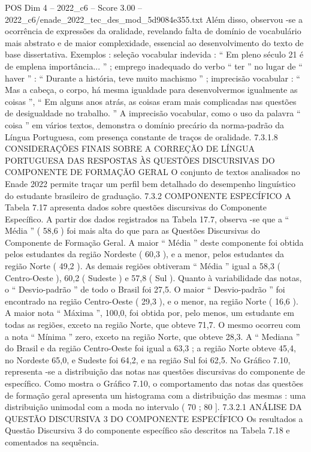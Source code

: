 \begin{textsample}{POS Dim 4 – 2022\_c6 – Score 3.00 – 2022\_c6/enade\_2022\_tec\_des\_mod\_5d9084e355.txt}
Além disso, observou -se a ocorrência de expressões da oralidade, revelando falta de domínio de vocabulário mais abstrato e de maior complexidade, essencial ao desenvolvimento do texto de base dissertativa.
Exemplos : seleção vocabular indevida : “ Em pleno século 21 é de emplena importância... ” ; emprego inadequado do verbo “ ter ” no lugar de “ haver ” : “ Durante a história, teve muito machismo ” ; imprecisão vocabular : “ Mas a cabeça, o corpo, há mesma igualdade para desenvolvermos igualmente as coisas ”, “ Em alguns anos atrás, as coisas eram mais complicadas nas questões de desigualdade no trabalho. ” A imprecisão vocabular, como o uso da palavra “ coisa ” em vários textos, demonstra o domínio precário da norma-padrão da Língua Portuguesa, com presença constante de traços de oralidade. 7.3.1.8 CONSIDERAÇÕES FINAIS SOBRE A CORREÇÃO DE LÍNGUA PORTUGUESA DAS RESPOSTAS ÀS QUESTÕES DISCURSIVAS DO COMPONENTE DE FORMAÇÃO GERAL O conjunto de textos analisados no Enade 2022 permite traçar um perfil bem detalhado do desempenho linguístico do estudante brasileiro de graduação. 7.3.2 COMPONENTE ESPECÍFICO A Tabela 7.17 apresenta dados sobre questões discursivas do Componente Específico.
A partir dos dados registrados na Tabela 17.7, observa -se que a “ Média ” ( 58,6 ) foi mais alta do que para as Questões Discursivas do Componente de Formação Geral.
A maior “ Média ” deste componente foi obtida pelos estudantes da região Nordeste ( 60,3 ), e a menor, pelos estudantes da região Norte ( 49,2 ).
As demais regiões obtiveram “ Média ” igual a 58,3 ( Centro-Oeste ), 60,2 ( Sudeste ) e 57,8 ( Sul ).
Quanto à variabilidade das notas, o “ Desvio-padrão ” de todo o Brasil foi 27,5.
O maior “ Desvio-padrão ” foi encontrado na região Centro-Oeste ( 29,3 ), e o menor, na região Norte ( 16,6 ).
A maior nota “ Máxima ”, 100,0, foi obtida por, pelo menos, um estudante em todas as regiões, exceto na região Norte, que obteve 71,7.
O mesmo ocorreu com a nota “ Mínima ” zero, exceto na região Norte, que obteve 28,3.
A “ Mediana ” do Brasil e da região Centro-Oeste foi igual a 63,3 ; a região Norte obteve 45,4, no Nordeste 65,0, e Sudeste foi 64,2, e na região Sul foi 62,5.
No Gráfico 7.10, representa -se a distribuição das notas nas questões discursivas do componente de específico.
Como mostra o Gráfico 7.10, o comportamento das notas das questões de formação geral apresenta um histograma com a distribuição das mesmas : uma distribuição unimodal com a moda no intervalo ( 70 ; 80 ]. 7.3.2.1 ANÁLISE DA QUESTÃO DISCURSIVA 3 DO COMPONENTE ESPECÍFICO Os resultados a Questão Discursiva 3 do componente específico são descritos na Tabela 7.18 e comentados na sequência.

\end{textsample}
